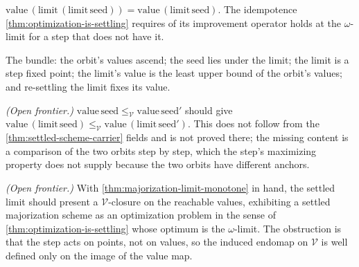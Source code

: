 \begin{theorem}\label{thm:settled-limit-value-idempotent}\leanok{}
\(\mathrm{value}\,(\mathrm{limit}\,(\mathrm{limit}\,\mathrm{seed})) =
\mathrm{value}\,(\mathrm{limit}\,\mathrm{seed})\). The idempotence
\ref{thm:optimization-is-settling} requires of its improvement operator holds at the \(\omega\)-limit
for a step that does not have it.
\end{theorem}

\begin{theorem}\label{thm:settled-orbit-scott-regime}\leanok{}
The bundle: the orbit's values ascend; the seed lies under the limit; the limit is a step fixed
point; the limit's value is the least upper bound of the orbit's values; and re-settling the limit
fixes its value.
\end{theorem}

\begin{theorem}\label{thm:majorization-limit-monotone}\notready{}
\emph{(Open frontier.)} \(\mathrm{value}\,\mathrm{seed} \le_{\mathcal{V}}
\mathrm{value}\,\mathrm{seed}'\) should give \(\mathrm{value}\,(\mathrm{limit}\,\mathrm{seed})
\le_{\mathcal{V}} \mathrm{value}\,(\mathrm{limit}\,\mathrm{seed}')\). This does not follow from the
\ref{thm:settled-scheme-carrier} fields and is not proved there; the missing content is a
comparison of the two orbits step by step, which the step's maximizing property does not supply
because the two orbits have different anchors.
\end{theorem}

\begin{theorem}\label{thm:majorization-yields-vclosure}\notready{}
\emph{(Open frontier.)} With \ref{thm:majorization-limit-monotone} in hand, the settled limit should
present a \(\mathcal{V}\)-closure on the reachable values, exhibiting a settled majorization scheme
as an optimization problem in the sense of \ref{thm:optimization-is-settling} whose optimum is the
\(\omega\)-limit. The obstruction is that the step acts on points, not on values, so the induced
endomap on \(\mathcal{V}\) is well defined only on the image of the value map.
\end{theorem}

